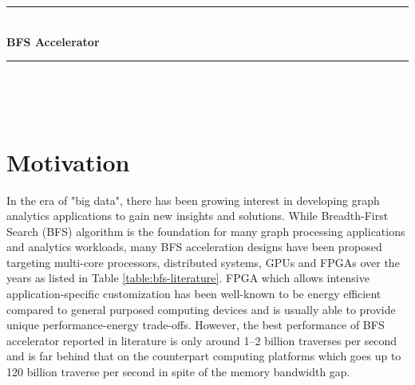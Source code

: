 \documentclass[12pt]{article} %
\begin{document}

\begin{titlepage}

\newcommand{\HRule}{\rule{\linewidth}{0.5mm}} %

\center %

\HRule \\[0.4cm]
{ \huge \bfseries BFS Accelerator}\\[0.4cm] %
\HRule \\[1.5cm]

\begin{minipage}{0.4\textwidth}
     \\ 
    \vspace{2em}
    \centering {\large \today}
\end{minipage}

\end{titlepage}




\section{Motivation} %
In the era of "big data", there has been growing interest in developing graph analytics 
applications to gain new insights and solutions. While Breadth-First Search (BFS) algorithm 
is the foundation for many graph processing applications and analytics workloads, many BFS 
acceleration designs have been proposed targeting multi-core processors, distributed systems, 
GPUs and FPGAs over the years as listed in Table \ref{table:bfs-literature}. 
FPGA which allows intensive application-specific customization 
has been well-known to be energy efficient compared to general purposed computing devices 
and is usually able to provide unique performance-energy trade-offs. However, the best 
performance of BFS accelerator reported in literature is only around \numrange{1}{2} billion 
traverses per second and is far behind that on the counterpart computing platforms 
which goes up to 120 billion traverse per second in spite of the memory bandwidth gap. 
\end{document}
